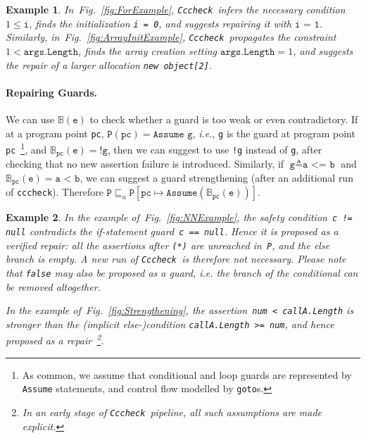 \documentclass[10pt]{sigplanconf}
\newtheorem{example}{Example}
\newcommand{\refFig}[1]{Fig.~\ref{fig:#1}}
\newcommand{\code}[1]{\texttt{#1}}
\newcommand{\clousot}{\code{cccheck}}
\newcommand{\Clousot}{\code{Cccheck}}
\begin{document}
\begin{example}\normalfont
In~\refFig{ForExample}, \Clousot\ infers the necessary condition $1
\leq \code{i}$, finds the initialization
\code{i = 0}, and suggests repairing it with $\code{i = 1}$.
Similarly, in~\refFig{ArrayInitExample}, \Clousot\ propagates the
constraint $1 < \code{args.Length}$, finds the array creation setting
$\code{args.Length} = 1$, and suggests the repair of a larger
allocation \code{new object[2]}. 
\end{example}

\paragraph{Repairing Guards.}
We can use $\mathbb{B}(\code{e})$ to check whether a guard is too weak
or even contradictory.  If at a program point \code{pc}, $\code{P}(\code{pc})
= \code{Assume g}$, \emph{i.e.}, \code{g} is the guard at program point
\code{pc}~\footnote{As common, we assume that conditional and loop
guards are represented by \code{Assume} statements, and control flow
modelled by \code{goto}s.}, and $\mathbb{B}_\code{pc}(\code{e}) =
\code{!g}$, then we can suggest to use \code{!g} instead of \code{g},
after checking that no new assertion failure is introduced.
Similarly, if $\code{g} \triangleq \code{a <= b}$ and
$\mathbb{B}_\code{pc}(\code{e}) = \code{a < b}$, we can suggest a
guard strengthening (after an additional run of \clousot).  Therefore
$\code{P} \sqsubseteq_a \code{P}[\code{pc} \mapsto
\code{Assume}(\mathbb{B}_\code{pc}(\code{e}))]$.

\begin{example}\normalfont
In the example of~\refFig{NNExample}, the safety condition~\code{c !=
null} contradicts the if-statement guard~\code{c == null}.  Hence it
is proposed as a verified repair: all the assertions after \code{(*)}
are unreached in~\code{P}, and the else branch is empty.  A new run of
\Clousot\ is therefore not necessary.  
Please note that \code{false} may also be proposed as a guard, \emph{i.e.} the branch of the conditional can be removed altogether.


In the example of~\refFig{Strengthening}, the assertion~\code{num < callA.Length} is
stronger than the (implicit else-)condition \code{callA.Length >=
num}, and hence proposed as a repair~\footnote{In an early stage of
\Clousot\ pipeline, all such assumptions are made explicit.}. 
\end{example}
\end{document}
